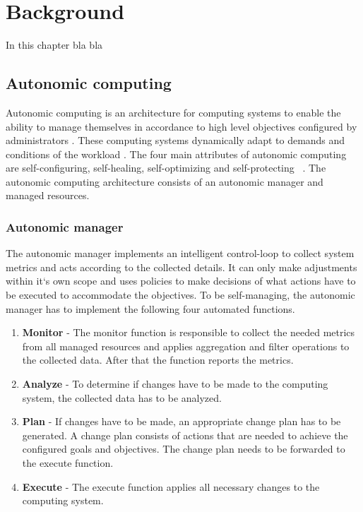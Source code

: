 \chapter{Background}
\label{sec:demo}
%
In this chapter bla bla

\section{Autonomic computing}
Autonomic computing is an architecture for computing systems to enable the ability to manage themselves in accordance to high level objectives configured by administrators \cite{Kephart2003VisionComputing}. 
These computing systems dynamically adapt to demands and conditions of the workload \cite{Kephart2003VisionComputing}.
The four main attributes of autonomic computing are self-configuring, self-healing, self-optimizing and self-protecting  \
. The autonomic computing architecture consists of an autonomic manager and managed resources.

\subsection{Autonomic manager}
The autonomic manager implements an intelligent control-loop to collect system metrics and acts according to the collected details. It can only make adjustments within it`s own scope and uses policies to make decisions of what actions have to be
executed to accommodate the objectives.
To be self-managing, the autonomic manager has to implement the following four automated functions.

\begin{enumerate}
\item \textbf{Monitor}
- The monitor function is responsible to collect the needed metrics from all managed resources and applies aggregation and filter
operations to the collected data. After that the function reports the metrics.

\item \textbf{Analyze}
- To determine if changes have to be made to the computing system, the collected data has to be analyzed.

\item \textbf{Plan}
- If changes have to be made, an appropriate change plan has to be generated. A change plan consists of actions that are needed to achieve the configured goals and objectives. The change plan needs to be forwarded to the execute function.

\item \textbf{Execute}
- The execute function applies all necessary changes to the computing system.

\end{enumerate}

